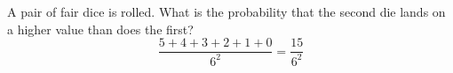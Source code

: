 \item A pair of fair dice is rolled. What is the probability that the second die lands on a higher value than does the first?
\[
\frac{5+4+3+2+1+0}{6^2} = \frac{15}{6^2}
\]